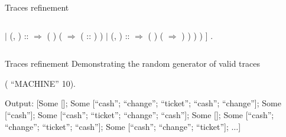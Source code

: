 \documentclass[t]{beamer}
\begin{document}
\begin{frame}{Traces refinement}
\begin{columns}[T]
		\begin{coqdoccode}
			\scriptsize
			\coqdocindent{1.00em}
			\ensuremath{|} (, ) :: \coqdocvar{\_} \ensuremath{\Rightarrow}\coqdoceol
			\coqdocindent{2.00em}
			 (   ) (\coqdoceol
			\coqdocindent{3.00em}
			  \ensuremath{\Rightarrow}  ( :: )\coqdoceol
			\coqdocindent{2.00em}
			)\coqdoceol
			\coqdocindent{1.00em}
			\ensuremath{|} (, ) :: \coqdocvar{\_} \ensuremath{\Rightarrow}\coqdoceol
			\coqdocindent{2.00em}
			 (   ) (\coqdoceol
			\coqdocindent{3.00em}
			  \ensuremath{\Rightarrow}  \coqdoceol
			\coqdocindent{2.00em}
			)\coqdoceol
			\coqdocindent{1.00em}
			\coqdoceol
			) ) ) ]	.\coqdoceol
		\end{coqdoccode}
	\end{columns}
\end{frame}

\begin{frame}{Traces refinement}
	Demonstrating the random generator of valid traces
	\vskip 0.1in
	\small
	\begin{coqdoccode}
		\coqdocnoindent
		 (  ``MACHINE'' 10).\coqdoceol
	\end{coqdoccode}
	\vskip 0.2in
	Output:
	\vskip 0.1in
	\ttfamily
	{[Some []; Some [``cash''; ``change''; ``ticket''; ``cash''; ``change'']};
	{Some [``cash'']; Some [``cash''; ``ticket''; ``change''; ``cash'']; Some []};
	{Some [``cash''; ``change''; ``ticket''; ``cash'']; Some [``cash''; ``change''; ``ticket'']; $\dots$]}
\end{frame}
\end{document}
